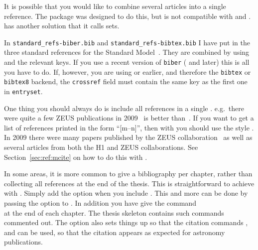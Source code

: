 It is possible that you would like to combine several articles into a
single reference. The  package was designed to do this,
but is not compatible with  and
.  has another solution that it
calls sets.

In \texttt{standard\_refs-biber.bib} and
\texttt{standard\_refs-bibtex.bib} I have put in the three standard
references for the Standard Model~\cite{gsw}. They are combined by
using  and the relevant
keys. If you use a recent version of \texttt{biber} ( and later)
this is all you have to do.  If, however, you are using  or earlier, and therefore the \texttt{bibtex} or \texttt{bibtex8} backend, the
\texttt{crossref} field must contain the same key as the first one in
\texttt{entryset}.

One thing you should always do is include all references in a single
. e.g.\ there were quite a few ZEUS publications in
2009~\cite{Chekanov:2009qja,Chekanov:2009zz,Chekanov:2009tu} is better
than~\cite{Chekanov:2009qja}\cite{Chekanov:2009zz}\cite{Chekanov:2009tu}.
If you want to get a list of references printed in the form \enquote{[m--n]},
then with  you should use the style
. In 2009 there were many papers published by the
ZEUS
collaboration~\cite{Chekanov:2009qja,Chekanov:2009zz,Chekanov:2009tu}
as well as several articles from both the H1 and ZEUS
collaborations\cite{Chekanov:2009wt,Aaron:2009wg}. See
Section~\ref{sec:ref:mcite} on how to do this with \BibTeX.

In some areas, it is more common to give a bibliography per chapter,
rather than collecting all references at the end of the thesis.
This is straightforward to achieve with .
Simply add the option  when you include .
This and more can be done by passing the option  to .
In addition you have give the command\\
 at the end of each chapter.
The thesis skeleton contains such commands commented out.
The option  also sets things up so that the  citation
commands ,  and  can be used,
so that the citation appears as expected for astronomy publications.

